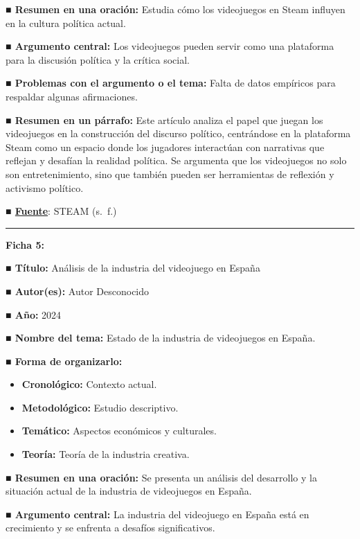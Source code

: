 \documentclass[
  letterpaper,
  DIV=11,
  numbers=noendperiod]{scrreprt}
\begin{document}
\textbf{■ Resumen en una oración:} Estudia cómo los videojuegos en Steam
influyen en la cultura política actual.

\textbf{■ Argumento central:} Los videojuegos pueden servir como una
plataforma para la discusión política y la crítica social.

\textbf{■ Problemas con el argumento o el tema:} Falta de datos
empíricos para respaldar algunas afirmaciones.

\textbf{■ Resumen en un párrafo:} Este artículo analiza el papel que
juegan los videojuegos en la construcción del discurso político,
centrándose en la plataforma Steam como un espacio donde los jugadores
interactúan con narrativas que reflejan y desafían la realidad política.
Se argumenta que los videojuegos no solo son entretenimiento, sino que
también pueden ser herramientas de reflexión y activismo político.

\textbf{■
\href{https://indexcomunicacion.es/index.php/indexcomunicacion/article/view/995}{Fuente}}:
STEAM (s.~f.)

\begin{center}\rule{0.5\linewidth}{0.5pt}\end{center}

\textbf{Ficha 5:}

\textbf{■ Título:} Análisis de la industria del videojuego en España

\textbf{■ Autor(es):} Autor Desconocido

\textbf{■ Año:} 2024

\textbf{■ Nombre del tema:} Estado de la industria de videojuegos en
España.

\textbf{■ Forma de organizarlo:}

\begin{itemize}
\item
  \textbf{Cronológico:} Contexto actual.
\item
  \textbf{Metodológico:} Estudio descriptivo.
\item
  \textbf{Temático:} Aspectos económicos y culturales.
\item
  \textbf{Teoría:} Teoría de la industria creativa.
\end{itemize}

\textbf{■ Resumen en una oración:} Se presenta un análisis del
desarrollo y la situación actual de la industria de videojuegos en
España.

\textbf{■ Argumento central:} La industria del videojuego en España está
en crecimiento y se enfrenta a desafíos significativos.
\end{document}
